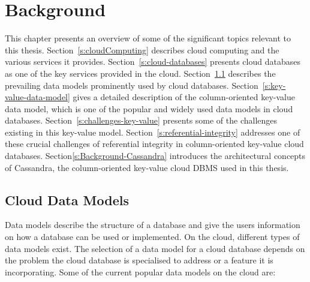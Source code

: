 \chapter{Background} \label{c:background}

This chapter  presents an overview of some of the significant topics relevant to
this thesis. Section~\ref{s:cloudComputing} describes cloud computing and the
various services it provides. Section~\ref{s:cloud-databases} presents cloud
databases as one of the key services provided in the cloud.
Section~\ref{s:cloud-data-models} describes the prevailing data models
prominently used by cloud databases. Section~\ref{s:key-value-data-model} gives
a detailed description of the column-oriented key-value data model, which is one
of the popular and widely used data models in cloud databases.
Section~\ref{s:challenges-key-value} presents some of the challenges existing in
this key-value model.
Section~\ref{s:referential-integrity} addresses one of these crucial challenges
of referential integrity in column-oriented key-value cloud databases.
Section\ref{s:Background-Cassandra} introduces the architectural concepts of
Cassandra, the column-oriented key-value cloud \ac{DBMS} used in this thesis.









\section{Cloud Data Models}\label{s:cloud-data-models}
Data models describe the structure of a database and give the users information
on how a database can be used or implemented.  On the cloud,   different types
of data models exist.  The selection of a data model for a cloud database
depends on the problem the cloud database is specialised to address or a feature
it is incorporating.  Some of the current popular data models on the cloud are:

